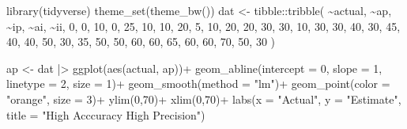 \documentclass[
  letterpaper,
  DIV=11,
  numbers=noendperiod]{scrreprt}
\newenvironment{Shaded}{\begin{snugshade}}{\end{snugshade}}
\newcommand{\AttributeTok}[1]{\textcolor[rgb]{0.40,0.45,0.13}{#1}}
\newcommand{\DecValTok}[1]{\textcolor[rgb]{0.68,0.00,0.00}{#1}}
\newcommand{\FunctionTok}[1]{\textcolor[rgb]{0.28,0.35,0.67}{#1}}
\newcommand{\NormalTok}[1]{\textcolor[rgb]{0.00,0.23,0.31}{#1}}
\newcommand{\OtherTok}[1]{\textcolor[rgb]{0.00,0.23,0.31}{#1}}
\newcommand{\SpecialCharTok}[1]{\textcolor[rgb]{0.37,0.37,0.37}{#1}}
\newcommand{\StringTok}[1]{\textcolor[rgb]{0.13,0.47,0.30}{#1}}
\begin{document}
\begin{Shaded}
\begin{Highlighting}[]
\FunctionTok{library}\NormalTok{(tidyverse)}
\FunctionTok{theme\_set}\NormalTok{(}\FunctionTok{theme\_bw}\NormalTok{())}
\NormalTok{dat }\OtherTok{\textless{}{-}} 
\NormalTok{tibble}\SpecialCharTok{::}\FunctionTok{tribble}\NormalTok{(}
  \SpecialCharTok{\textasciitilde{}}\NormalTok{actual,   }\SpecialCharTok{\textasciitilde{}}\NormalTok{ap,   }\SpecialCharTok{\textasciitilde{}}\NormalTok{ip,   }\SpecialCharTok{\textasciitilde{}}\NormalTok{ai,   }\SpecialCharTok{\textasciitilde{}}\NormalTok{ii,}
        \DecValTok{0}\NormalTok{,     }\DecValTok{0}\NormalTok{,    }\DecValTok{10}\NormalTok{,     }\DecValTok{0}\NormalTok{,    }\DecValTok{25}\NormalTok{,}
       \DecValTok{10}\NormalTok{,    }\DecValTok{10}\NormalTok{,    }\DecValTok{20}\NormalTok{,     }\DecValTok{5}\NormalTok{,    }\DecValTok{10}\NormalTok{,}
       \DecValTok{20}\NormalTok{,    }\DecValTok{20}\NormalTok{,    }\DecValTok{30}\NormalTok{,    }\DecValTok{30}\NormalTok{,    }\DecValTok{10}\NormalTok{,}
       \DecValTok{30}\NormalTok{,    }\DecValTok{30}\NormalTok{,    }\DecValTok{40}\NormalTok{,    }\DecValTok{30}\NormalTok{,    }\DecValTok{45}\NormalTok{,}
       \DecValTok{40}\NormalTok{,    }\DecValTok{40}\NormalTok{,    }\DecValTok{50}\NormalTok{,    }\DecValTok{30}\NormalTok{,    }\DecValTok{35}\NormalTok{,}
       \DecValTok{50}\NormalTok{,    }\DecValTok{50}\NormalTok{,    }\DecValTok{60}\NormalTok{,    }\DecValTok{60}\NormalTok{,    }\DecValTok{65}\NormalTok{,}
       \DecValTok{60}\NormalTok{,    }\DecValTok{60}\NormalTok{,    }\DecValTok{70}\NormalTok{,    }\DecValTok{50}\NormalTok{,    }\DecValTok{30}
\NormalTok{  )}

\NormalTok{ap }\OtherTok{\textless{}{-}}\NormalTok{ dat }\SpecialCharTok{|\textgreater{}} 
  \FunctionTok{ggplot}\NormalTok{(}\FunctionTok{aes}\NormalTok{(actual, ap))}\SpecialCharTok{+}
  \FunctionTok{geom\_abline}\NormalTok{(}\AttributeTok{intercept =} \DecValTok{0}\NormalTok{, }\AttributeTok{slope =} \DecValTok{1}\NormalTok{, }
              \AttributeTok{linetype =} \DecValTok{2}\NormalTok{, }\AttributeTok{size =} \DecValTok{1}\NormalTok{)}\SpecialCharTok{+}
    \FunctionTok{geom\_smooth}\NormalTok{(}\AttributeTok{method =} \StringTok{"lm"}\NormalTok{)}\SpecialCharTok{+}
   \FunctionTok{geom\_point}\NormalTok{(}\AttributeTok{color =} \StringTok{"orange"}\NormalTok{, }\AttributeTok{size =} \DecValTok{3}\NormalTok{)}\SpecialCharTok{+}
   \FunctionTok{ylim}\NormalTok{(}\DecValTok{0}\NormalTok{,}\DecValTok{70}\NormalTok{)}\SpecialCharTok{+}
  \FunctionTok{xlim}\NormalTok{(}\DecValTok{0}\NormalTok{,}\DecValTok{70}\NormalTok{)}\SpecialCharTok{+}
  \FunctionTok{labs}\NormalTok{(}\AttributeTok{x =} \StringTok{"Actual"}\NormalTok{, }\AttributeTok{y =} \StringTok{"Estimate"}\NormalTok{,}
       \AttributeTok{title =} \StringTok{"High Acccuracy High Precision"}\NormalTok{)}


\end{Highlighting}
\end{Shaded}
\end{document}
